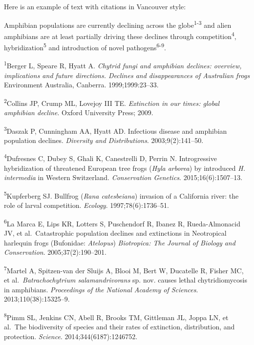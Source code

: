 \documentclass[
]{krantz}
\renewenvironment{quote}{\begin{VF}}{\end{VF}}
\begin{document}
Here is an example of text \citep[from][]{measey2016global} with citations in Vancouver style:

\begin{quote}
Amphibian populations are currently declining across the globe\textsuperscript{1-3} and alien amphibians are at least partially driving these declines through competition\textsuperscript{4}, hybridization\textsuperscript{5} and introduction of novel pathogens\textsuperscript{6-9}.
\end{quote}

\textsuperscript{1}Berger L, Speare R, Hyatt A. \emph{Chytrid fungi and amphibian declines: overview, implications and future directions. Declines and disappearances of Australian frogs} Environment Australia, Canberra. 1999;1999:23--33.

\textsuperscript{2}Collins JP, Crump ML, Lovejoy III TE. \emph{Extinction in our times: global amphibian decline}. Oxford University Press; 2009.

\textsuperscript{3}Daszak P, Cunningham AA, Hyatt AD. Infectious disease and amphibian population declines. \emph{Diversity and Distributions}. 2003;9(2):141--50.

\textsuperscript{4}Dufresnes C, Dubey S, Ghali K, Canestrelli D, Perrin N. Introgressive hybridization of threatened European tree frogs (\emph{Hyla arborea}) by introduced \emph{H. intermedia} in Western Switzerland. \emph{Conservation Genetics}. 2015;16(6):1507--13.

\textsuperscript{5}Kupferberg SJ. Bullfrog (\emph{Rana catesbeiana}) invasion of a California river: the role of larval competition. \emph{Ecology}. 1997;78(6):1736--51.

\textsuperscript{6}La Marca E, Lips KR, Lotters S, Puschendorf R, Ibanez R, Rueda-Almonacid JV, et al.~Catastrophic population declines and extinctions in Neotropical harlequin frogs (Bufonidae: \emph{Atelopus}) \emph{Biotropica: The Journal of Biology and Conservation}. 2005;37(2):190--201.

\textsuperscript{7}Martel A, Spitzen-van der Sluijs A, Blooi M, Bert W, Ducatelle R, Fisher MC, et al.~\emph{Batrachochytrium salamandrivorans} sp. nov. causes lethal chytridiomycosis in amphibians. \emph{Proceedings of the National Academy of Sciences}. 2013;110(38):15325--9.

\textsuperscript{8}Pimm SL, Jenkins CN, Abell R, Brooks TM, Gittleman JL, Joppa LN, et al.~The biodiversity of species and their rates of extinction, distribution, and protection. \emph{Science}. 2014;344(6187):1246752.
\end{document}
